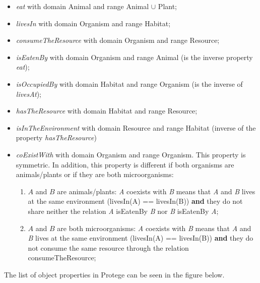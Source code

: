     \begin{itemize}
        \item \textit{eat} with domain Animal and range Animal $\cup$ Plant;

        \item \textit{livesIn} with domain Organism and range Habitat;

        \item \textit{consumeTheResource} with domain Organism and range Resource;

        \item \textit{isEatenBy} with domain Organism and range Animal (is the inverse property \textit{eat});

        \item \textit{isOccupiedBy} with domain Habitat and range Organism (is the inverse of \textit{livesAt});

        \item \textit{hasTheResource} with domain Habitat and range Resource;

        \item \textit{isInTheEnvironment} with domain Resource and range Habitat (inverse of the property \textit{hasTheResource})

        \item \textit{coExistWith} with domain Organism and range Organism. This property is symmetric. In addition, this property is different if both organisms are animals/plants or if they are both microorganisms:
        \begin{enumerate}
            \item $A$ and $B$ are animals/plants: \textit{A} coexists with \textit{B} means that \textit{A} and \textit{B} lives at the same environment (livesIn(A) == livesIn(B)) \textbf{and} they do not share neither the relation \textit{A} isEatenBy \textit{B} nor \textit{B} isEatenBy \textit{A};

            \item $A$ and $B$ are both microorganisms: \textit{A} coexists with \textit{B} means that \textit{A} and \textit{B} lives at the same environment (livesIn(A) == livesIn(B)) \textbf{and} they do not consume the same resource through the relation consumeTheResource;
            \\
            
        \end{enumerate}
    \end{itemize}

The list of object properties in Protege can be seen in the figure below.

